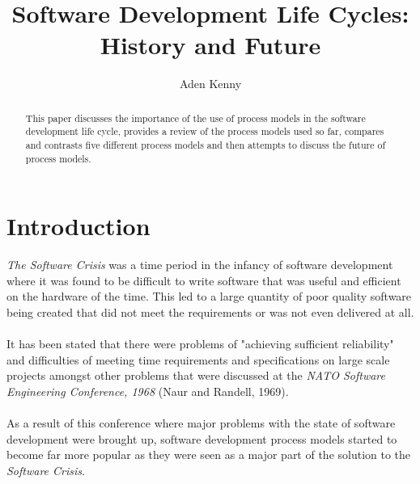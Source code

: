 \documentclass{CRPITStyle}
\begin{document}
	\title {Software Development Life Cycles: History and Future}
	\author {Aden Kenny}
	\maketitle

	\begin {abstract} 
		This paper discusses the importance of the use of process models in the software development life cycle, provides a
		review of the process models used so far, compares and contrasts five different process models and then attempts to
		discuss the future of process models.
	\end {abstract}

	
	\section {Introduction} 
		\textit{The Software Crisis} was a time period in the infancy of software development where it was found to be difficult 
		to write software that was useful and efficient on the hardware of the time. This led to a large quantity of poor quality
		software being created that did not meet the requirements or was not even delivered at all.\\
		~\\
		It has been stated that there were problems of "achieving sufficient reliability" and difficulties of meeting time
		requirements and specifications on large scale projects amongst other problems that were discussed at the \textit{NATO
		Software Engineering Conference, 1968} (Naur and Randell, 1969).\\
		~\\
		As a result of this conference where major problems with the state of software development were brought up, software
		development process models started to become far more popular as they were seen as a major part of the solution to the
		\textit{Software Crisis}.
\end{document}
